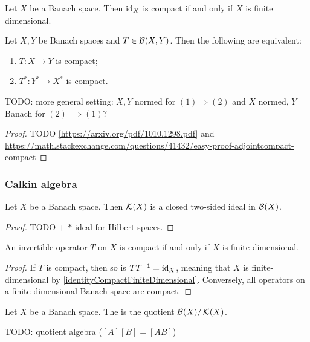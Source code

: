 \begin{lemma} \label{identityCompactFiniteDimensional}
Let $X$ be a Banach space. Then $\operatorname{id}_X$ is compact \textup{if and only if} $X$ is finite dimensional.
\end{lemma}

\begin{theorem} \label{SchaudersTheorem}
Let $X,Y$ be Banach spaces and $T\in\operatorname{\mathcal{B}}(X,Y)$. Then the following are equivalent:
\begin{enumerate}
\item $T: X\to Y$ is compact;
\item $T^*: Y^* \to X^*$ is compact.
\end{enumerate}
\end{theorem}
TODO: more general setting: $X,Y$ normed for $(1) \Rightarrow (2)$ and $X$ normed, $Y$ Banach for $(2)\implies (1)$?
\begin{proof}
TODO \ref{https://arxiv.org/pdf/1010.1298.pdf} and \url{https://math.stackexchange.com/questions/41432/easy-proof-adjointcompact-compact}
\end{proof}

\subsubsection{Calkin algebra}
\begin{proposition}
Let $X$ be a Banach space. Then $\operatorname{\mathcal{K}}(X)$ is a closed two-sided ideal in $\operatorname{\mathcal{B}}(X)$.
\end{proposition}
\begin{proof}
TODO + $*$-ideal for Hilbert spaces.
\end{proof}
\begin{corollary}
An invertible operator $T$ on $X$ is compact \textup{if and only if} $X$ is finite-dimensional.
\end{corollary}
\begin{proof}
If $T$ is compact, then so is $TT^{-1} = \operatorname{id}_X$, meaning that $X$ is finite-dimensional by \ref{identityCompactFiniteDimensional}. Conversely, all operators on a finite-dimensional Banach space are compact.
\end{proof}

\begin{definition}
Let $X$ be a Banach space. The  is the quotient $\operatorname{\mathcal{B}}(X)/\operatorname{\mathcal{K}}(X)$.
\end{definition}
TODO: quotient algebra ($[A][B] = [AB]$)

